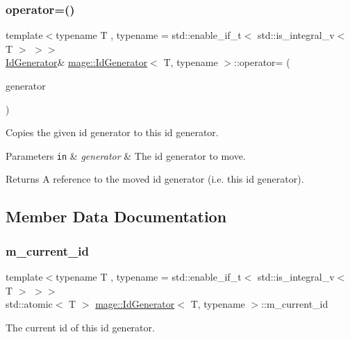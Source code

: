 \subsubsection{\texorpdfstring{operator=()}{operator=()}\hspace{0.1cm}{\footnotesize\ttfamily [2/2]}}
{\footnotesize\ttfamily template$<$typename T , typename  = std\+::enable\+\_\+if\+\_\+t$<$ std\+::is\+\_\+integral\+\_\+v$<$ T $>$ $>$$>$ \\
\mbox{\hyperlink{classmage_1_1_id_generator}{Id\+Generator}}\& \mbox{\hyperlink{classmage_1_1_id_generator}{mage\+::\+Id\+Generator}}$<$ T, typename $>$\+::operator= (\begin{DoxyParamCaption}\item[{\mbox{\hyperlink{classmage_1_1_id_generator}{Id\+Generator}}$<$ T, typename $>$ \&\&}]{generator }\end{DoxyParamCaption})\hspace{0.3cm}{\ttfamily [delete]}}

Copies the given id generator to this id generator.


\begin{DoxyParams}[1]{Parameters}
\mbox{\tt in}  & {\em generator} & The id generator to move. \\
\hline
\end{DoxyParams}
\begin{DoxyReturn}{Returns}
A reference to the moved id generator (i.\+e. this id generator). 
\end{DoxyReturn}


\subsection{Member Data Documentation}
\mbox{\label{classmage_1_1_id_generator_a4b7ad6d3d123054eeae05619e18c7c70}} 
\subsubsection{\texorpdfstring{m\+\_\+current\+\_\+id}{m\_current\_id}}
{\footnotesize\ttfamily template$<$typename T , typename  = std\+::enable\+\_\+if\+\_\+t$<$ std\+::is\+\_\+integral\+\_\+v$<$ T $>$ $>$$>$ \\
std\+::atomic$<$ T $>$ \mbox{\hyperlink{classmage_1_1_id_generator}{mage\+::\+Id\+Generator}}$<$ T, typename $>$\+::m\+\_\+current\+\_\+id\hspace{0.3cm}{\ttfamily [private]}}

The current id of this id generator. 